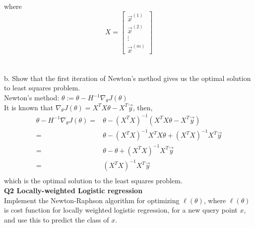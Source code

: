 \documentclass{article}
\begin{document}
where
\[
    X = \begin{bmatrix} \vec{x}^{(1)} \\ \vec{x}^{(2)} \\ \vdots \\ \vec{x}^{(m)} \end{bmatrix}
\]
\\\\
b. Show that the first iteration of Newton's method gives us the optimal solution to least squares problem.\\
Newton's method: \(\theta := \theta - H^{-1} \nabla _{\theta}J(\theta)\) \\
It is known that \(\nabla _{\theta}J(\theta) = X^{T}X \theta - X^{T} \vec{y} \), then,
\begin{align*}
    \theta - H^{-1} \nabla _{\theta}J(\theta) = & \theta - (X^{T}X)^{-1}(X^{T}X\theta - X^{T} \vec{y}) \\
    = & \theta - (X^{T}X)^{-1}X^{T}X\theta + (X^{T}X)^{-1}X^{T} \vec{y}\\
    = & \theta - \theta +   (X^{T}X)^{-1}X^{T} \vec{y}\\
    = &  (X^{T}X)^{-1}X^{T} \vec{y}\\
\end{align*} 
which is the optimal solution to the least squares problem. \\
\clearpage
{\large \bf Q2 Locally-weighted Logistic regression}\\
Implement the Newton-Raphson algorithm for optimizing \(\ell(\theta)\), where \(\ell (\theta)\) is cost function for locally weighted logistic regression, for a new query point
\(x\), and use this to predict the class of \(x\). 
\end{document}
